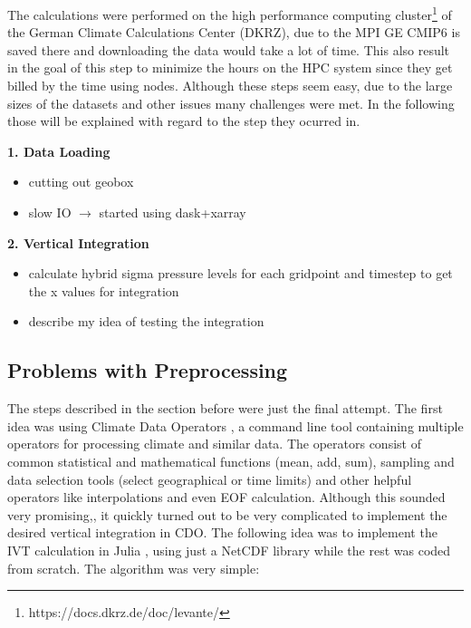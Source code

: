 The calculations were performed on the high performance computing cluster\footnote{https://docs.dkrz.de/doc/levante/} of the German Climate Calculations Center (DKRZ), due to the MPI GE CMIP6 is saved there and downloading the data would take a lot of time. 
This also result in the goal of this step to minimize the hours on the HPC system since they get billed by the time using nodes. 
Although these steps seem easy, due to the large sizes of the datasets and other issues many challenges were met. 
In the following those will be explained with regard to the step they ocurred in. 



\textbf{1. Data Loading}

\begin{itemize}
  \item cutting out geobox
  \item slow IO $\rightarrow$ started using dask+xarray 
\end{itemize}

\textbf{2. Vertical Integration}

\begin{itemize}
  \item calculate hybrid  sigma pressure levels for each gridpoint and timestep to get the x values for integration
  \item describe my idea of testing the integration
  
\end{itemize}

\subsection{Problems with Preprocessing}

The steps described in the section before were just the final attempt. 
The first idea was using Climate Data Operators \cite{schulzweida2024}, a command line tool containing multiple operators for processing climate and similar data. 
The operators consist of common statistical and mathematical functions (mean, add, sum), sampling and data selection tools (select geographical or time limits) and other helpful operators like interpolations and even EOF calculation. 
Although this sounded very promising,, it quickly turned out to be very complicated to implement the desired vertical integration in CDO.
The following idea was to implement the IVT calculation in Julia \cite{gao_julia_2020}, using just a NetCDF library \cite{} while the rest was coded from scratch. 
The algorithm was very simple: 

